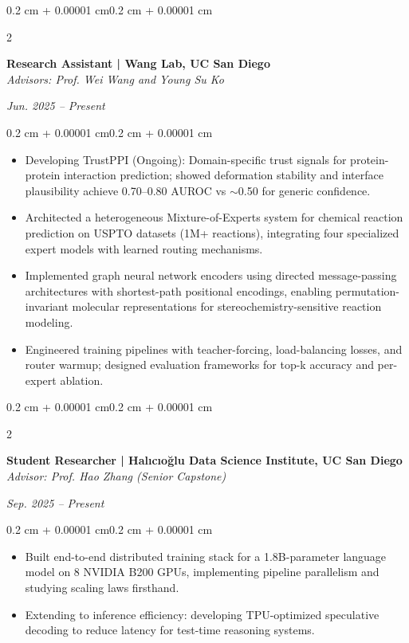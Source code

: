\documentclass[10pt, letterpaper]{article}
\newenvironment{highlights}{
    \begin{itemize}[
        topsep=0.10 cm,
        parsep=0.10 cm,
        partopsep=0pt,
        itemsep=0pt,
        leftmargin=0.4 cm + 10pt
    ]
}{\end{itemize}}
\newenvironment{onecolentry}{
    \begin{adjustwidth}{0.2 cm + 0.00001 cm}{0.2 cm + 0.00001 cm}
}{\end{adjustwidth}}
\newenvironment{twocolentry}[2][]{
    \onecolentry
    \def\secondColumn{#2}
    \setcolumnwidth{\fill, 4.5 cm}
    \begin{paracol}{2}
}{
    \switchcolumn \raggedleft \secondColumn
    \end{paracol}
    \endonecolentry
}
\begin{document}
    \begin{twocolentry}{\textit{Jun. 2025 -- Present}}
        \textbf{Research Assistant | Wang Lab, UC San Diego}\\
        \textit{Advisors: Prof. Wei Wang and Young Su Ko}
    \end{twocolentry}
    \vspace{0.10 cm}
    \begin{onecolentry}
        \begin{highlights}
            \item Developing TrustPPI (Ongoing): Domain-specific trust signals for protein-protein interaction prediction; showed deformation stability and interface plausibility achieve 0.70--0.80 AUROC vs $\sim$0.50 for generic confidence.
            \item Architected a heterogeneous Mixture-of-Experts system for chemical reaction prediction on USPTO datasets (1M+ reactions), integrating four specialized expert models with learned routing mechanisms.
            \item Implemented graph neural network encoders using directed message-passing architectures with shortest-path positional encodings, enabling permutation-invariant molecular representations for stereochemistry-sensitive reaction modeling.
            \item Engineered training pipelines with teacher-forcing, load-balancing losses, and router warmup; designed evaluation frameworks for top-k accuracy and per-expert ablation.
        \end{highlights}
    \end{onecolentry}
    \vspace{0.20 cm}

    \begin{twocolentry}{\textit{Sep. 2025 -- Present}}
        \textbf{Student Researcher | Halıcıo\u{g}lu Data Science Institute, UC San Diego}\\
        \textit{Advisor: Prof. Hao Zhang (Senior Capstone)}
    \end{twocolentry}
    \vspace{0.10 cm}
    \begin{onecolentry}
        \begin{highlights}
            \item Built end-to-end distributed training stack for a 1.8B-parameter language model on 8 NVIDIA B200 GPUs, implementing pipeline parallelism and studying scaling laws firsthand.
            \item Extending to inference efficiency: developing TPU-optimized speculative decoding to reduce latency for test-time reasoning systems.
        \end{highlights}
    \end{onecolentry}
    \vspace{0.20 cm}
\end{document}
